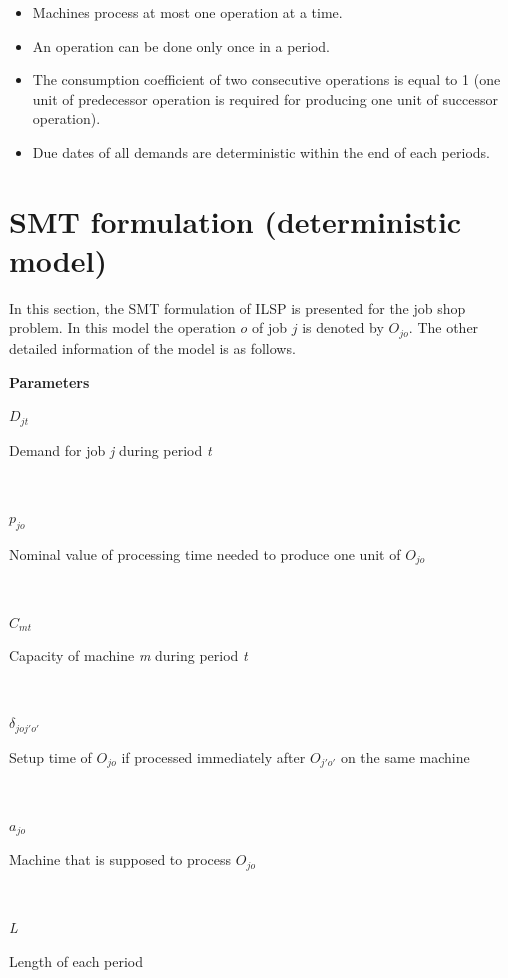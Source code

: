\documentclass[letterpaper]{article} %
\begin{document}
\begin{itemize}
\item Machines process at most one operation at a time.
\item An operation can be done only once in a period.
\item The consumption coefficient of two consecutive operations is equal to 1 (one unit of predecessor operation is required for producing one unit of successor operation).
\item Due dates of all demands are deterministic within the end of each periods.
\end{itemize}

\section{SMT formulation (deterministic model)}
In this section, the SMT formulation of ILSP is presented for the job shop problem. In this model the operation $o$ of job $j$ is denoted by \textit{$O_{jo}$}. The other detailed information of the model is as follows.

\noindent\textbf{Parameters}\\
\parbox{30pt}{\textit{$D_{jt}$}} 
\parbox[t]{207pt}{Demand for job \textit{j} during period \textit{t}}\\
\parbox{30pt}{\textit{$p_{jo}$}} 
\parbox[t]{207pt}{Nominal value of processing time needed to produce one unit of $O_{jo}$}\\
\parbox{30pt}{\textit{$C_{mt}$}} 
\parbox[t]{207pt}{Capacity of machine \textit{m} during period \textit{t}}\\
\parbox{30pt}{\textit{$\delta_{joj'o'}$}} 
\parbox[t]{207pt}{Setup time of $O_{jo}$ if processed immediately after $O_{j'o'}$ on the same machine}\\
\parbox{30pt}{\textit{$a_{jo}$}} 
\parbox[t]{207pt}{Machine  that is supposed to process $O_{jo}$}\\
\parbox{30pt}{\textit{L}} 
\parbox[t]{207pt}{Length of each period}\\
\end{document}
